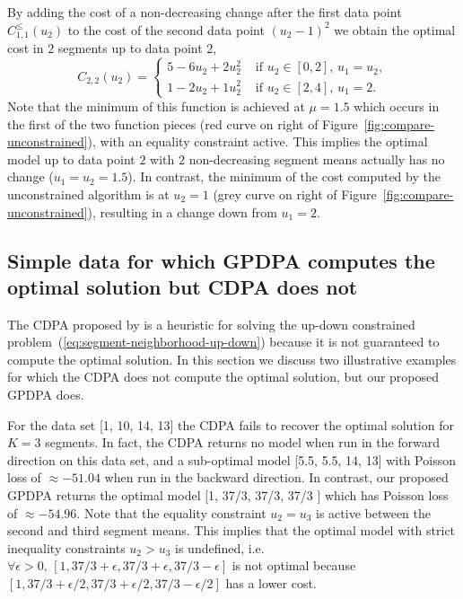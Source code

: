 \documentclass[twoside,11pt]{article}
\begin{document}
By adding the cost of a non-decreasing change after the first data
point $C_{1,1}^\leq(u_2)$ to the cost of the second data point
$(u_2-1)^2$ we obtain the optimal cost in $2$ segments up to data
point $2$,
\begin{equation}
  C_{2,2}(u_2) = 
  \begin{cases}
    5 - 6 u_2 + 2 u_2^2 &\text{ if }u_2\in[0,2],\,  u_1=u_2,\\
    1 - 2 u_2 + 1 u_2^2 &\text{ if }u_2\in[2,4],\,  u_1=2.
  \end{cases}
\end{equation}
Note that the minimum of this function is achieved at $\mu=1.5$ which
occurs in the first of the two function pieces (red curve on right of
Figure~\ref{fig:compare-unconstrained}), with an equality constraint
active. This implies the optimal model up to data point $2$ with
$2$ non-decreasing segment means actually has no change
($u_1=u_2=1.5$). In contrast, the minimum of the cost computed by the
unconstrained algorithm is at $u_2=1$ (grey curve on right of
Figure~\ref{fig:compare-unconstrained}), resulting in a change down
from $u_1=2$.


\subsection{Simple data for which GPDPA computes the optimal solution
  but CDPA does not}

The CDPA proposed by \citep{HOCKING-PeakSeg} is a heuristic for
solving the up-down constrained problem~(\ref{eq:segment-neighborhood-up-down}) because it is not
guaranteed to compute the optimal solution. In this section we discuss
two illustrative examples for which the CDPA does not compute the optimal
solution, but our proposed GPDPA does.

For the data set [1, 10, 14, 13] the CDPA fails to recover
the optimal solution for $K=3$ segments. In fact, the CDPA returns no
model when run in the forward direction on this data set, and a
sub-optimal model [5.5, 5.5, 14, 13] with Poisson loss of
$\approx -51.04$ when run in the backward direction. In contrast, our
proposed GPDPA returns the optimal model [1, 37/3, 37/3, 37/3 ] which
has Poisson loss of $\approx -54.96$. Note that the equality
constraint $u_2=u_3$ is active between the second and third segment
means. This implies that the optimal model with strict inequality
constraints $u_2>u_3$ is undefined, i.e. $\forall \epsilon>0,\, [1, 37/3
+ \epsilon, 37/3 + \epsilon, 37/3 - \epsilon]$ is not optimal because
$[1, 37/3 + \epsilon/2, 37/3 +\epsilon/2, 37/3 - \epsilon/2]$ has a
lower cost.
\end{document}
